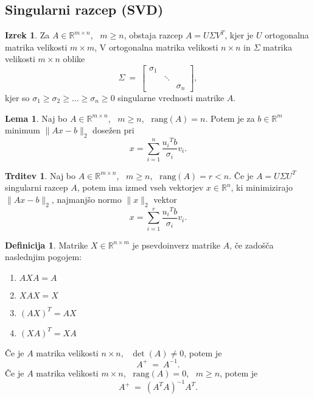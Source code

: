 \documentclass[11pt]{article}
\theoremstyle{definition}
\newtheorem{definicija}{Definicija}[section]
\newtheorem{lema}{Lema}
\newtheorem{trditev}{Trditev}
\newtheorem{izrek}{Izrek}
\begin{document}

\subsection{Singularni razcep (SVD)}
\vspace{0.5cm}

\begin{izrek}

Za $A \in \mathbb{R}^{m \times n}$, ~$m \geq n$, obstaja razcep $A = U \Sigma V^T$, kjer je $U$ ortogonalna matrika velikosti $m \times m$, V ortogonalna matrika velikosti $n \times n$ in $\Sigma$ matrika velikosti $m \times n$ oblike
$$\Sigma ~=~ \begin{bmatrix}
\sigma_1 & ~ & ~ \\
~ & \ddots & ~ \\
~ & ~ & \sigma_n
\end{bmatrix},$$
kjer so $\sigma_1 \geq \sigma_2 \geq \ldots \geq \sigma_n \geq 0$ singularne vrednosti matrike $A$.

\end{izrek}
\vspace{0.5cm}

\begin{lema}

Naj bo $A \in \mathbb{R}^{m \times n}$, ~$m \geq n$, ~$\text{rang}(A) = n$. Potem je za $b \in \mathbb{R}^m$ minimum $\|Ax - b\|_2$ dosežen pri 
$$x = \sum_{i=1}^n \frac{{u_i}^T b}{\sigma_i} v_i.$$
 
\end{lema}
\vspace{0.5cm}

\begin{trditev}

Naj bo $A \in \mathbb{R}^{m \times n}$, ~$m \geq n$, ~$\text{rang}(A) = r < n$. Če je $A = U \Sigma U^T$ singularni razcep $A$, potem ima izmed vseh vektorjev $x \in \mathbb{R}^n$, ki minimizirajo $\|Ax - b\|_2$, najmanjšo normo $\|x\|_2$ vektor
$$x = \sum_{i=1}^r \frac{{u_i}^T b}{\sigma_i} v_i.$$

\end{trditev}
\vspace{0.5cm}

\begin{definicija}

Matrike $X \in \mathbb{R}^{n \times m}$ je psevdoinverz matrike $A$, če zadošča naslednjim pogojem:
\begin{enumerate}
	\item $AXA = A$
	\item $XAX = X$
	\item $(AX)^T = AX$
	\item $(XA)^T = XA$
\end{enumerate} 
Če je $A$ matrika velikosti $n \times n$, ~$\det(A) \neq 0$, potem je
$$A^+ ~=~ A^{-1}.$$ 
Če je $A$ matrika velikosti $m \times n$, ~$\text{rang}(A) = 0$, ~$m \geq n$, potem je  $$A^+ ~=~ (A^T A)^{-1} A^T.$$

\end{definicija}
\vspace{0.5cm}
\end{document}
